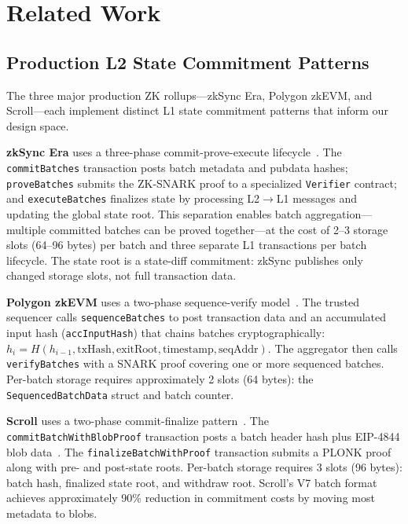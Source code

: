 \section{Related Work}
\label{sec:related-work}

\subsection{Production L2 State Commitment Patterns}

The three major production ZK rollups---zkSync Era, Polygon zkEVM, and Scroll---each
implement distinct L1 state commitment patterns that inform our design space.

\textbf{zkSync Era} uses a three-phase commit-prove-execute lifecycle~\cite{zksync2024docs,
quarkslab2023zksync}. The \texttt{commitBatches} transaction posts batch metadata and
pubdata hashes; \texttt{proveBatches} submits the ZK-SNARK proof to a specialized
\texttt{Verifier} contract; and \texttt{executeBatches} finalizes state by processing
L2$\to$L1 messages and updating the global state root. This separation enables batch
aggregation---multiple committed batches can be proved together---at the cost of 2--3
storage slots (64--96 bytes) per batch and three separate L1 transactions per batch
lifecycle. The state root is a state-diff commitment: zkSync publishes only changed
storage slots, not full transaction data.

\textbf{Polygon zkEVM} uses a two-phase sequence-verify model~\cite{polygon2024zkevm,
polygonzkevm2024contract}. The trusted sequencer calls \texttt{sequenceBatches} to post
transaction data and an accumulated input hash (\texttt{accInputHash}) that chains batches
cryptographically: $h_i = H(h_{i-1}, \text{txHash}, \text{exitRoot}, \text{timestamp},
\text{seqAddr})$. The aggregator then calls \texttt{verifyBatches} with a SNARK proof
covering one or more sequenced batches. Per-batch storage requires approximately 2 slots
(64 bytes): the \texttt{SequencedBatchData} struct and batch counter.

\textbf{Scroll} uses a two-phase commit-finalize pattern~\cite{scroll2024docs,
scrollchain2024contract}. The \texttt{commitBatchWithBlobProof} transaction posts a batch
header hash plus EIP-4844 blob data~\cite{eip4844}. The \texttt{finalizeBatchWithProof}
transaction submits a PLONK proof along with pre- and post-state roots. Per-batch storage
requires 3 slots (96 bytes): batch hash, finalized state root, and withdraw root. Scroll's
V7 batch format achieves approximately 90\% reduction in commitment costs by moving most
metadata to blobs.

